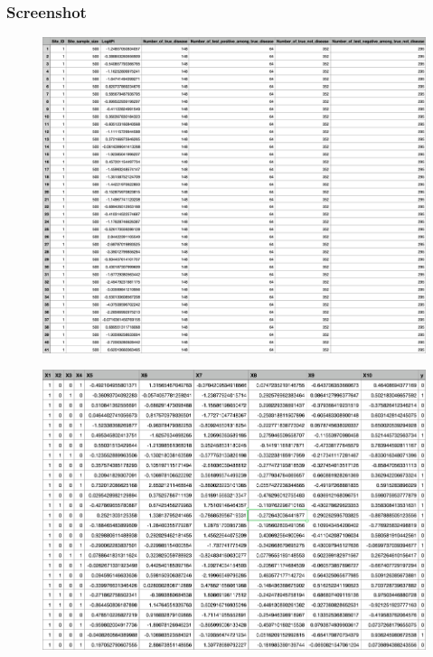 \documentclass[12pt]{article}
\theoremstyle{definition}
\theoremstyle{remark}
\begin{document}
\subsubsection*{Screenshot}
\begin{figure}[h!]
	\centering
	\includegraphics[scale=0.4]{data_screenshot_2.jpg}
\end{figure}
\begin{figure}[h!]
	\centering
	\includegraphics[scale=0.55]{data_screenshot.jpg}
\end{figure}
\newpage
\end{document}
